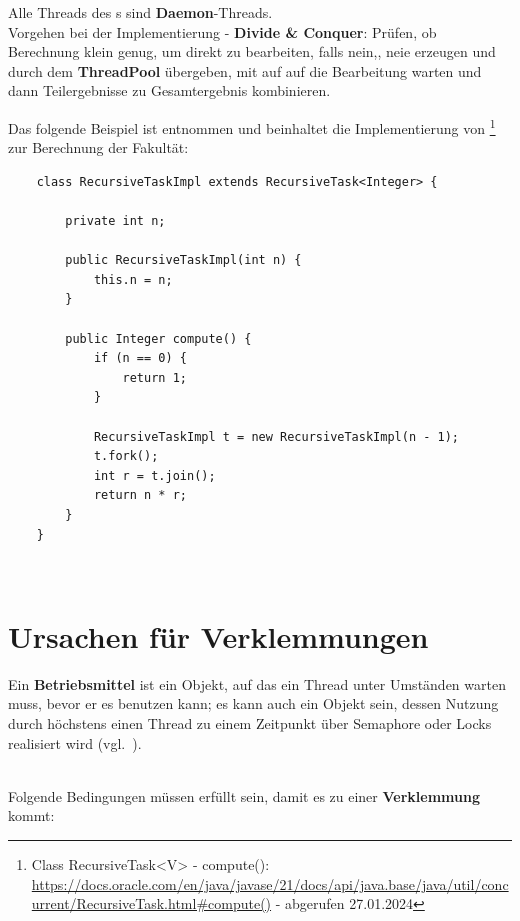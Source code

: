 \noindent
Alle Threads des s sind \textbf{Daemon}-Threads.\\

\noindent
Vorgehen bei der Implementierung - \textbf{Divide & Conquer}: Prüfen, ob Berechnung klein genug, um direkt zu bearbeiten, falls nein,, neie  erzeugen und durch  dem \textbf{ThreadPool} übergeben, mit  auf auf die Bearbeitung warten und dann Teilergebnisse zu Gesamtergebnis kombinieren.

Das folgende Beispiel ist \cite[168, Listing 3.25]{Oec22} entnommen und beinhaltet die Implementierung von \footnote{
    Class RecursiveTask<V> - compute(): \url{https://docs.oracle.com/en/java/javase/21/docs/api/java.base/java/util/concurrent/RecursiveTask.html#compute()} - abgerufen 27.01.2024
} zur Berechnung der Fakultät:
\begin{verbatim}
    class RecursiveTaskImpl extends RecursiveTask<Integer> {

        private int n;

        public RecursiveTaskImpl(int n) {
            this.n = n;
        }

        public Integer compute() {
            if (n == 0) {
                return 1;
            }

            RecursiveTaskImpl t = new RecursiveTaskImpl(n - 1);
            t.fork();
            int r = t.join();
            return n * r;
        }
    }
\end{verbatim}\\

\section{Ursachen für Verklemmungen}\label{sec:deadlockreason}

\begin{tcolorbox}
    Ein \textbf{Betriebsmittel} ist ein Objekt, auf das ein Thread unter Umständen warten muss, bevor er es benutzen kann; es kann auch ein Objekt sein, dessen Nutzung durch höchstens einen Thread zu einem Zeitpunkt über Semaphore oder Locks realisiert wird (vgl.~\cite[186]{Oec22}).
\end{tcolorbox}\\

\noindent
Folgende Bedingungen müssen erfüllt sein, damit es zu einer \textbf{Verklemmung} kommt:


